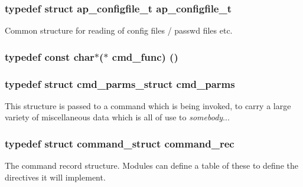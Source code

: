 \subsubsection[{\texorpdfstring{ap\+\_\+configfile\+\_\+t}{ap_configfile_t}}]{\setlength{\rightskip}{0pt plus 5cm}typedef struct {\bf ap\+\_\+configfile\+\_\+t} {\bf ap\+\_\+configfile\+\_\+t}}\hypertarget{group__APACHE__CORE__CONFIG_ga223feaeca3495bb572d50f40fcd9cc9b}{}\label{group__APACHE__CORE__CONFIG_ga223feaeca3495bb572d50f40fcd9cc9b}
Common structure for reading of config files / passwd files etc. 
\subsubsection[{\texorpdfstring{cmd\+\_\+func}{cmd_func}}]{\setlength{\rightskip}{0pt plus 5cm}typedef const char$\ast$($\ast$ cmd\+\_\+func) ()}\hypertarget{group__APACHE__CORE__CONFIG_gad46309b45efbf192bb44197ed4e37b5f}{}\label{group__APACHE__CORE__CONFIG_gad46309b45efbf192bb44197ed4e37b5f}
\subsubsection[{\texorpdfstring{cmd\+\_\+parms}{cmd_parms}}]{\setlength{\rightskip}{0pt plus 5cm}typedef struct {\bf cmd\+\_\+parms\+\_\+struct} {\bf cmd\+\_\+parms}}\hypertarget{group__APACHE__CORE__CONFIG_ga1791fbd28d06a9847bad001541c5241e}{}\label{group__APACHE__CORE__CONFIG_ga1791fbd28d06a9847bad001541c5241e}
This structure is passed to a command which is being invoked, to carry a large variety of miscellaneous data which is all of use to {\itshape somebody}... 
\subsubsection[{\texorpdfstring{command\+\_\+rec}{command_rec}}]{\setlength{\rightskip}{0pt plus 5cm}typedef struct {\bf command\+\_\+struct} {\bf command\+\_\+rec}}\hypertarget{group__APACHE__CORE__CONFIG_ga79f84e70f072880482a3fd004ae48710}{}\label{group__APACHE__CORE__CONFIG_ga79f84e70f072880482a3fd004ae48710}
The command record structure. Modules can define a table of these to define the directives it will implement. 
